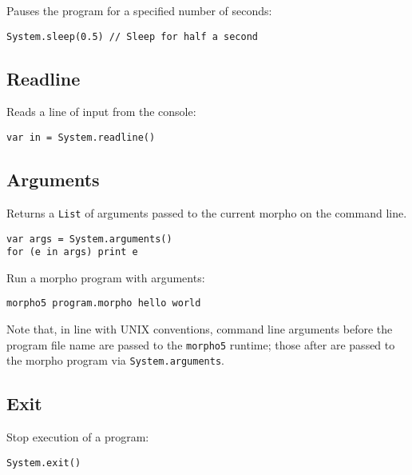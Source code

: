 Pauses the program for a specified number of seconds:

\begin{lstlisting}
System.sleep(0.5) // Sleep for half a second
\end{lstlisting}

\hypertarget{readline}{%
\subsection{Readline}\label{readline}}

Reads a line of input from the console:

\begin{lstlisting}
var in = System.readline() 
\end{lstlisting}

\hypertarget{arguments}{%
\subsection{Arguments}\label{arguments}}

Returns a \texttt{List} of arguments passed to the current morpho on the
command line.

\begin{lstlisting}
var args = System.arguments() 
for (e in args) print e 
\end{lstlisting}

Run a morpho program with arguments:

\begin{lstlisting}
morpho5 program.morpho hello world
\end{lstlisting}

Note that, in line with UNIX conventions, command line arguments before
the program file name are passed to the \texttt{morpho5} runtime; those
after are passed to the morpho program via \texttt{System.arguments}.

\hypertarget{exit}{%
\subsection{Exit}\label{exit}}

Stop execution of a program:

\begin{lstlisting}
System.exit() 
\end{lstlisting}
